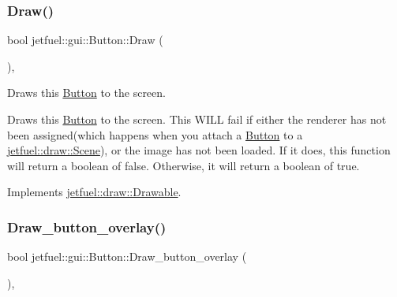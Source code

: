 \mbox{\label{classjetfuel_1_1gui_1_1Button_a1c8ec68b90dc461b1603c47fb8c509c4}} 
\subsubsection{\texorpdfstring{Draw()}{Draw()}}
{\footnotesize\ttfamily bool jetfuel\+::gui\+::\+Button\+::\+Draw (\begin{DoxyParamCaption}{ }\end{DoxyParamCaption})\hspace{0.3cm}{\ttfamily [override]}, {\ttfamily [virtual]}}



Draws this \hyperlink{classjetfuel_1_1gui_1_1Button}{Button} to the screen. 

Draws this \hyperlink{classjetfuel_1_1gui_1_1Button}{Button} to the screen. This W\+I\+LL fail if either the renderer has not been assigned(which happens when you attach a \hyperlink{classjetfuel_1_1gui_1_1Button}{Button} to a \hyperlink{classjetfuel_1_1draw_1_1Scene}{jetfuel\+::draw\+::\+Scene}), or the image has not been loaded. If it does, this function will return a boolean of false. Otherwise, it will return a boolean of true. 

Implements \hyperlink{classjetfuel_1_1draw_1_1Drawable_a1a072070322965ce9411ee6e7c311c56}{jetfuel\+::draw\+::\+Drawable}.

\mbox{\label{classjetfuel_1_1gui_1_1Button_ae1e89337652fc30fb7c4997f5b887da3}} 
\subsubsection{\texorpdfstring{Draw\+\_\+button\+\_\+overlay()}{Draw\_button\_overlay()}}
{\footnotesize\ttfamily bool jetfuel\+::gui\+::\+Button\+::\+Draw\+\_\+button\+\_\+overlay (\begin{DoxyParamCaption}{ }\end{DoxyParamCaption})\hspace{0.3cm}{\ttfamily [inline]}, {\ttfamily [protected]}}



